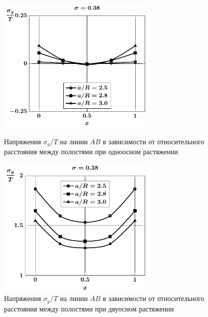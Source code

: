 \begin{russian}
\begin{figure}[th!]
\centering\footnotesize
\parbox[b]{7.5cm}{\centering\includegraphics[width=7.5cm]{spheres-cav9-a-t1-sig_y.pdf}
\caption{Напряжения $\sigma_y/T$ на линии $AB$ в зависимости от относительного расстояния между полостями при одноосном растяжении
\label{f:8:33}}}\hfil\hfil
\parbox[b]{7.5cm}{\centering\includegraphics[width=7.5cm]{spheres-cav9-a-t2-sig_y.pdf}
\caption{Напряжения $\sigma_y/T$ на линии $AB$ в зависимости от относительного расстояния между полостями при двуосном растяжении
\label{f:8:34}}}
\end{figure}


\end{russian}
